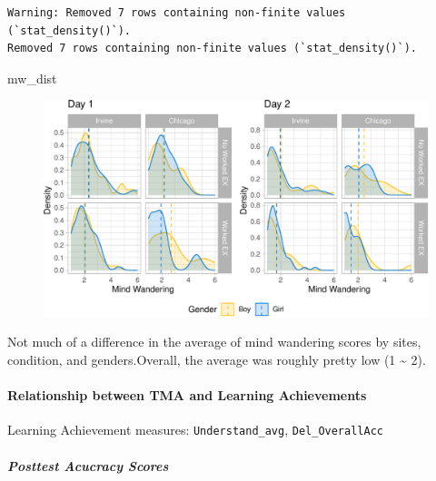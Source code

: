 \documentclass[
  letterpaper,
  DIV=11,
  numbers=noendperiod]{scrartcl}
\let\oldparagraph\paragraph
\renewcommand{\paragraph}[1]{\oldparagraph{#1}\mbox{}}
\let\oldsubparagraph\subparagraph
\renewcommand{\subparagraph}[1]{\oldsubparagraph{#1}\mbox{}}
\newenvironment{Shaded}{\begin{snugshade}}{\end{snugshade}}
\newcommand{\NormalTok}[1]{\textcolor[rgb]{0.00,0.44,0.13}{#1}}
\begin{document}
\begin{verbatim}
Warning: Removed 7 rows containing non-finite values (`stat_density()`).
Removed 7 rows containing non-finite values (`stat_density()`).
\end{verbatim}

\begin{Shaded}
\begin{Highlighting}[]
\NormalTok{mw\_dist}
\end{Highlighting}
\end{Shaded}

\begin{figure}[H]

{\centering \includegraphics{sampling_files/figure-pdf/unnamed-chunk-17-1.pdf}

}

\end{figure}

Not much of a difference in the average of mind wandering scores by
sites, condition, and genders.Overall, the average was roughly pretty
low (1 \textasciitilde{} 2).

\hypertarget{relationship-between-tma-and-learning-achievements}{%
\paragraph{Relationship between TMA and Learning
Achievements}\label{relationship-between-tma-and-learning-achievements}}

Learning Achievement measures: \texttt{Understand\_avg},
\texttt{Del\_OverallAcc}

\hypertarget{posttest-acucracy-scores}{%
\subparagraph{Posttest Acucracy Scores}\label{posttest-acucracy-scores}}
\end{document}
